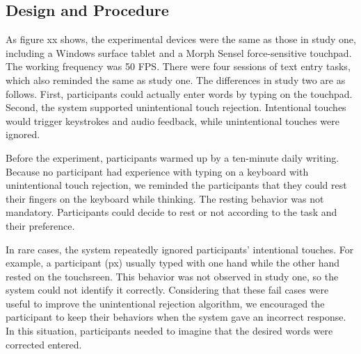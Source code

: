 
\subsection{Design and Procedure}

As figure xx shows, the experimental devices were the same as those in study one, including a Windows surface tablet and a Morph Sensel force-sensitive touchpad. The working frequency was 50 FPS. There were four sessions of text entry tasks, which also reminded the same as study one. The differences in study two are as follows. First, participants could actually enter words by typing on the touchpad. Second, the system supported unintentional touch rejection. Intentional touches would trigger keystrokes and audio feedback, while unintentional touches were ignored.

Before the experiment, participants warmed up by a ten-minute daily writing. Because no participant had experience with typing on a keyboard with unintentional touch rejection, we reminded the participants that they could rest their fingers on the keyboard while thinking. The resting behavior was not mandatory. Participants could decide to rest or not according to the task and their preference.


In rare cases, the system repeatedly ignored participants' intentional touches. For example, a participant (px) usually typed with one hand while the other hand rested on the touchsreen. This behavior was not observed in study one, so the system could not identify it correctly. Considering that these fail cases were useful to improve the unintentional rejection algorithm, we encouraged the participant to keep their behaviors when the system gave an incorrect response. In this situation, participants needed to imagine that the desired words were corrected entered.

